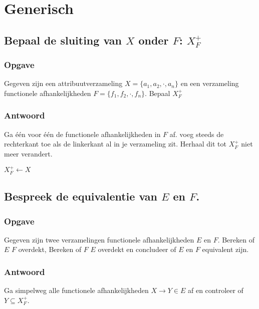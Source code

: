 \documentclass[normaalvormen.tex]{subfiles}
\begin{document}
\chapter{Generisch}
\renewcommand\thesection{V\arabic{section}}
\renewcommand\thesubsection{V\arabic{section}}

\section{Bepaal de sluiting van $X$ onder $F$: $X_{F}^{+}$}
\subsection*{Opgave}
Gegeven zijn een attribuutverzameling $X = \{a_1,a_2,\cdot,a_n\}$ en een verzameling functionele afhankelijkheden $F=  \{f_1,f_2,\cdot,f_n\}$. Bepaal $X_{F}^{+}$
\subsection*{Antwoord}
Ga \'e\'en voor \'e\'en de functionele afhankelijkheden in $F$ af. voeg steeds de rechterkant toe als de linkerkant al in je verzameling zit. Herhaal dit tot $X_{F}^{+}$ niet meer verandert.
\begin{mdframed}
\begin{algorithm}[H]
$X_{F}^{+} \leftarrow X$\\
\end{algorithm}
\end{mdframed}


\section{Bespreek de equivalentie van $E$ en $F$.}
\subsection*{Opgave}
Gegeven zijn twee verzamelingen functionele afhankelijkheden $E$ en $F$. Bereken of $E$ $F$ overdekt, Bereken of $F$ $E$ overdekt en concludeer of $E$ en $F$ equivalent zijn.
\subsection*{Antwoord}
Ga simpelweg alle functionele afhankelijkheden $X\rightarrow Y \in E$ af en controleer of $Y \subseteq X_{F}^{+}$.
\begin{mdframed}
\begin{algorithm}[H]
\end{algorithm}
\end{mdframed}
\end{document}
